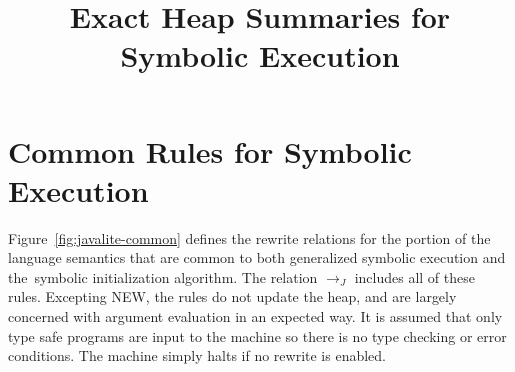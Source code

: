 \documentclass[pldi]{sigplanconf-pldi15}
\newcommand{\figref}[1]{Figure~\ref{#1}}
\newcommand{\com}{\ensuremath{J}}
\newcommand{\rcom}{\ensuremath{\rightarrow_\com}}
\newcommand{\symtxt}{symbolic initialization}
\begin{document}




\title{Exact Heap Summaries for Symbolic Execution}


\maketitle

\begin{abstract}

\end{abstract}



%
%
%
%





\section{Common Rules for Symbolic Execution}


\figref{fig:javalite-common} defines
the rewrite relations for the portion of the language
semantics that are common to both generalized symbolic execution and
the~\symtxt{} algorithm. The relation $\rcom$ includes all of these
rules. Excepting \textrm{N{\footnotesize EW}}, the rules do not update
the heap, and are largely concerned with argument evaluation in an
expected way. It is assumed that only type safe programs are input to
the machine so there is no type checking or error conditions. The
machine simply halts if no rewrite is enabled.
\end{document}

